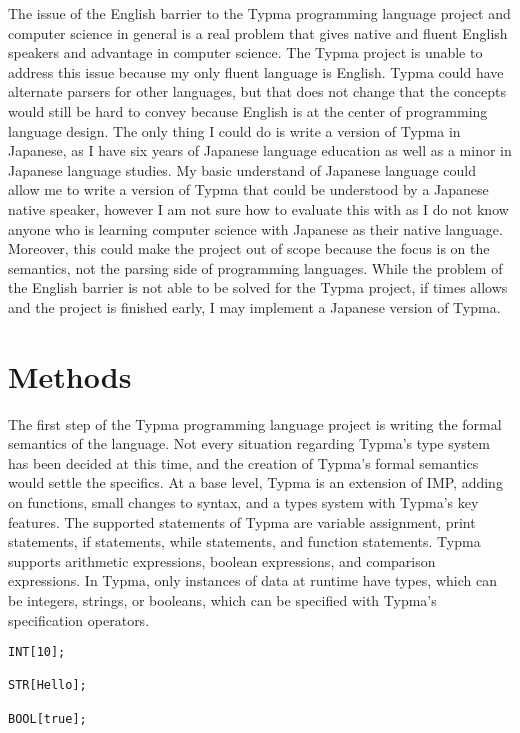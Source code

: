 \documentclass[10pt,twocolumn]{article}
\begin{document}
The issue of the English barrier to the Typma programming language project and computer science in general is a real problem that gives native and fluent English speakers and advantage in computer science. The Typma project is unable to address this issue because my only fluent language is English. Typma could have alternate parsers for other languages, but that does not change that the concepts would still be hard to convey because English is at the center of programming language design. The only thing I could do is write a version of Typma in Japanese, as I have six years of Japanese language education as well as a minor in Japanese language studies. My basic understand of Japanese language could allow me to write a version of Typma that could be understood by a Japanese native speaker, however I am not sure how to evaluate this with as I do not know anyone who is learning computer science with Japanese as their native language. Moreover, this could make the project out of scope because the focus is on the semantics, not the parsing side of programming languages. While the problem of the English barrier is not able to be solved for the Typma project, if times allows and the project is finished early, I may implement a Japanese version of Typma.

\section{Methods}

The first step of the Typma programming language project is writing the formal semantics of the language. Not every situation regarding Typma's type system has been decided at this time, and the creation of Typma's formal semantics would settle the specifics. At a base level, Typma is an extension of IMP, adding on functions, small changes to syntax, and a types system with Typma's key features. The supported statements of Typma are variable assignment, print statements, if statements, while statements, and function statements. Typma supports arithmetic expressions, boolean expressions, and comparison expressions. In Typma, only instances of data at runtime have types, which can be integers, strings, or booleans, which can be specified with Typma's specification operators.

\begin{lstlisting}
INT[10];

STR[Hello];

BOOL[true];
\end{lstlisting}
\end{document}
